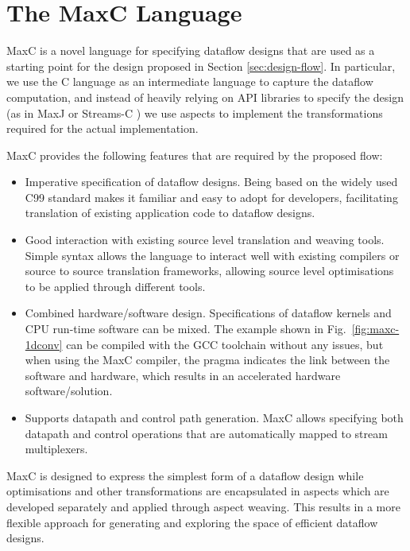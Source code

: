 \section{The  MaxC Language}
\label{sec:maxc}

MaxC is a novel language for specifying dataflow designs that are used
as a starting point for the design proposed in Section
\ref{sec:design-flow}. In particular, we use
the C language as an intermediate language to capture the dataflow computation, and instead
of heavily relying on API libraries to specify the design (as in MaxJ
\cite{MaxelerTechnologies:2012} or Streams-C
\cite{Gokhale:Stone:Arnold:Kalinowski:2000}) we use aspects to
implement the transformations required for the actual implementation.

MaxC provides the following features that are
required by the proposed flow:

\begin{itemize}
\item Imperative specification of dataflow designs. Being based on the
  widely used C99 standard makes it familiar and easy to adopt for
  developers, facilitating translation of existing application code to
  dataflow designs.
\item Good interaction with existing source level translation and
  weaving tools. Simple syntax allows the language to interact well
  with existing compilers or source to source translation frameworks,
  allowing source level optimisations to be applied through different
  tools.
\item Combined hardware/software design. Specifications of dataflow
  kernels and CPU run-time software can be mixed. The example shown in
  Fig.~\ref{fig:maxc-1dconv} can be compiled with the GCC toolchain
  without any issues, but when using the MaxC compiler, the pragma
  indicates the link between the software and hardware, which results
  in an accelerated hardware software/solution.
\item Supports datapath and control path generation. MaxC allows
  specifying both datapath and control operations that are
  automatically mapped to stream multiplexers.
\end{itemize}

MaxC is designed to express the simplest form of a dataflow design
while optimisations and other transformations are encapsulated in
aspects which are developed separately and applied through aspect
weaving. This results in a more flexible approach for generating and
exploring the space of efficient dataflow designs.

